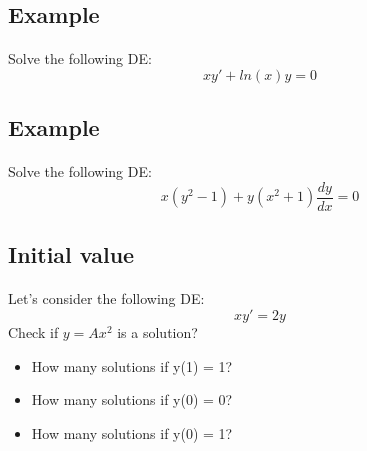 \subsection{Example}
\begin{frame}{
    \insertsectionhead}
    \framesubtitle{\insertsubsectionhead}
    Solve the following DE:
        \begin{equation*} \tag{10}
            xy' + ln(x)y = 0
        \end{equation*}
        \newline\newline\newline\newline\newline
\end{frame}

\subsection{Example}
\begin{frame}{
    \insertsectionhead}
    \framesubtitle{\insertsubsectionhead}
    Solve the following DE:
        \begin{equation*} \tag{11}
            x(y^2 - 1) + y(x^2 + 1)\frac{dy}{dx} = 0
        \end{equation*}
        \newline\newline\newline\newline\newline
\end{frame}

\subsection{Initial value}
\begin{frame}{
    \insertsectionhead}
    \framesubtitle{\insertsubsectionhead}
    Let's consider the following DE:
        \begin{equation*} \tag{12}
            xy' = 2y
        \end{equation*}
    Check if $y = A{x^2}$ is a solution?
        \begin{itemize}
            \item How many solutions if y(1) = 1?
            \item How many solutions if y(0) = 0?
            \item How many solutions if y(0) = 1?
        \end{itemize}
\end{frame}

